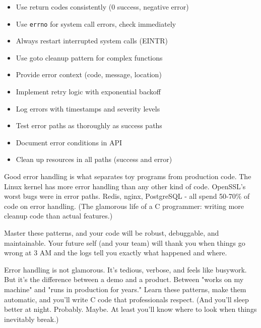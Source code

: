 \begin{itemize}
    \item Use return codes consistently (0 success, negative error)
    \item Use \texttt{errno} for system call errors, check immediately
    \item Always restart interrupted system calls (EINTR)
    \item Use goto cleanup pattern for complex functions
    \item Provide error context (code, message, location)
    \item Implement retry logic with exponential backoff
    \item Log errors with timestamps and severity levels
    \item Test error paths as thoroughly as success paths
    \item Document error conditions in API
    \item Clean up resources in all paths (success and error)
\end{itemize}

Good error handling is what separates toy programs from production code. The Linux kernel has more error handling than any other kind of code. OpenSSL's worst bugs were in error paths. Redis, nginx, PostgreSQL - all spend 50-70\% of code on error handling. (The glamorous life of a C programmer: writing more cleanup code than actual features.)

Master these patterns, and your code will be robust, debuggable, and maintainable. Your future self (and your team) will thank you when things go wrong at 3 AM and the logs tell you exactly what happened and where.

\begin{tipbox}
Error handling is not glamorous. It's tedious, verbose, and feels like busywork. But it's the difference between a demo and a product. Between "works on my machine" and "runs in production for years." Learn these patterns, make them automatic, and you'll write C code that professionals respect. (And you'll sleep better at night. Probably. Maybe. At least you'll know where to look when things inevitably break.)
\end{tipbox}
